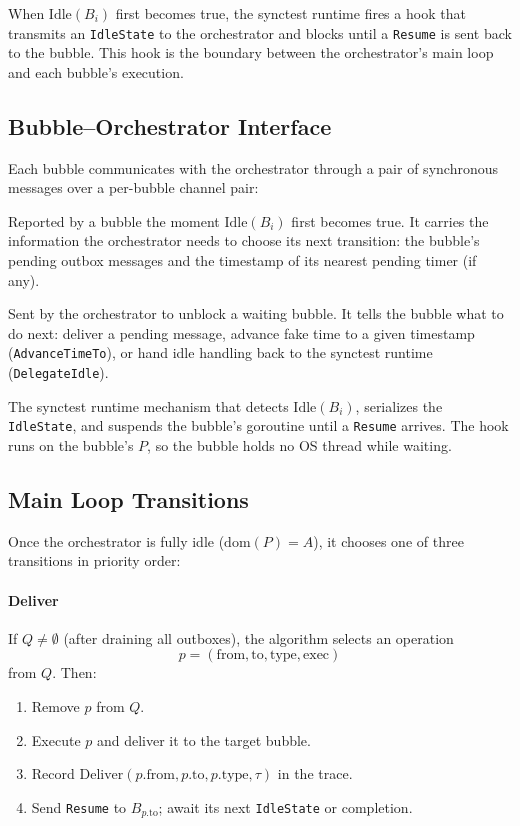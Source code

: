 \documentclass[11pt]{article}
\begin{document}
When $\text{Idle}(B_i)$ first becomes true, the synctest runtime fires a hook that transmits an \texttt{IdleState} to the orchestrator and blocks until a \texttt{Resume} is sent back to the bubble. This hook is the boundary between the orchestrator's main loop and each bubble's execution.

\subsection{Bubble--Orchestrator Interface}

Each bubble communicates with the orchestrator through a pair of synchronous messages over a per-bubble channel pair:

\begin{description}[leftmargin=0pt,labelindent=0pt]
\item[\texttt{IdleState}] Reported by a bubble the moment $\text{Idle}(B_i)$ first becomes true. It carries the information the orchestrator needs to choose its next transition: the bubble's pending outbox messages and the timestamp of its nearest pending timer (if any).

\item[\texttt{Resume}] Sent by the orchestrator to unblock a waiting bubble. It tells the bubble what to do next: deliver a pending message, advance fake time to a given timestamp (\texttt{AdvanceTimeTo}), or hand idle handling back to the synctest runtime (\texttt{DelegateIdle}).

\item[Hook] The synctest runtime mechanism that detects $\text{Idle}(B_i)$, serializes the \texttt{IdleState}, and suspends the bubble's goroutine until a \texttt{Resume} arrives. The hook runs on the bubble's $P$, so the bubble holds no OS thread while waiting.
\end{description}

\subsection{Main Loop Transitions}

Once the orchestrator is fully idle ($\mathrm{dom}(P) = A$), it chooses one of three transitions in priority order:

\paragraph{Deliver}
If $Q \neq \emptyset$ (after draining all outboxes), the algorithm selects an operation
\[
p = (\text{from}, \text{to}, \text{type}, \text{exec})
\]
from $Q$. Then:
\begin{enumerate}[leftmargin=1.5em]
    \item Remove $p$ from $Q$.
    \item Execute $p$ and deliver it to the target bubble.
    \item Record $\text{Deliver}(p.\text{from}, p.\text{to}, p.\text{type}, \tau)$ in the trace.
    \item Send \texttt{Resume} to $B_{p.\text{to}}$; await its next \texttt{IdleState} or completion.
\end{enumerate}
\end{document}
